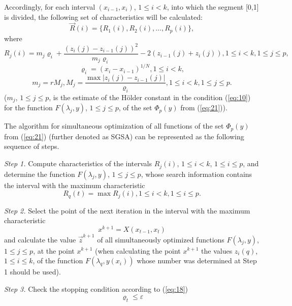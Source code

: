 \documentclass[runningheads]{llncs}
\begin{document}
Accordingly, for each interval $(x_{i-1},x_i)$, $1 \leq i < k$, into which the segment [0,1] is divided, the following set of characteristics will be calculated:
\begin{equation}
\label{eq:26}
\overrightarrow{R}(i)=\{R_1(i), R_2(i), \dots, R_p(i)\},
\end{equation}
where
\begin{equation}
\label{eq:27}
R_j(i)=m_j \varrho_i+\frac{(z_i(j)-z_{i-1}(j))^2}{m_j \varrho_i} - 2(z_{i-1}(j)+z_i(j)),1 \leq i < k,1 \leq j \leq p,
\end{equation}
\begin{equation}
\label{eq:28}
\varrho_i=(x_i-x_{i-1} )^{1/N}  ,1 \leq i<k,
\end{equation}
\begin{equation}
\label{eq:29}
m_j = r M_j, M_j=\frac{\max|z_i (j)-z_{i-1} (j)|}{\varrho_i} ,1\leq i < k, 1 \leq j \leq p.
\end{equation}
($m_j$, $1 \leq j \leq p$, is the estimate of the H{\"o}lder  constant in the condition (\ref{eq:10}) for the function $F(\lambda_j,y)$, $1 \leq j \leq p$, of the set $\Phi_p(y)$ from (\ref{eq:21})).

The algorithm for simultaneous optimization of all functions of the set $\Phi_p(y)$ from (\ref{eq:21}) (further denoted as SGSA) can be represented as the following sequence of steps.

\textit{Step 1.} Compute characteristics of the intervals $R_j (i)$, $1 \leq i < k$, $1 \leq i \leq p$, and determine the function $F(\lambda_j,y)$, $1 \leq j \leq p$, whose search information contains the interval with the maximum characteristic
\begin{equation}
\label{eq:30}
R_q (t)=\max R_j (i), 1 \leq i < k, 1 \leq i \leq p.
\end{equation}

\textit{Step 2.} Select the point of the next iteration in the interval with the maximum characteristic
\begin{equation}
\label{eq:31}
x^{k+1}=X(x_{t-1},x_t )
\end{equation}
and calculate the value $\overrightarrow{z}^{k+1}$ of all simultaneously optimized functions $F(\lambda_j,y)$, $1 \leq j \leq p$, at the point $x^{k+1}$ (when calculating the point  $x^{k+1}$ the values $z_i (q)$, $1 \leq i \leq k$, of the function $F(\lambda_q,y(x_i))$ whose number was determined at Step 1 should be used).

\textit{Step 3.} Check the stopping condition according to (\ref{eq:18})
\begin{equation}
\label{eq:32}
\varrho_t \leq \varepsilon
\end{equation}
\end{document}
